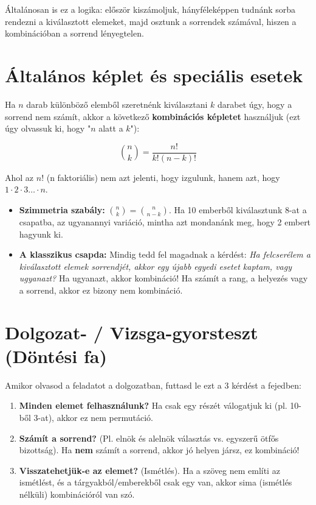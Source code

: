 \documentclass[11pt,a4paper]{article}
\begin{document}
Általánosan is ez a logika: először kiszámoljuk, hányféleképpen tudnánk sorba rendezni a kiválasztott elemeket, majd osztunk a sorrendek számával, hiszen a kombinációban a sorrend lényegtelen.

\section{Általános képlet és speciális esetek}
Ha $n$ darab különböző elemből szeretnénk kiválasztani $k$ darabet úgy, hogy a sorrend nem számít, akkor a következő \textbf{kombinációs képletet} használjuk (ezt úgy olvassuk ki, hogy "$n$ alatt a $k$"):

$$\binom{n}{k} = \frac{n!}{k!(n-k)!}$$

Ahol az $n!$ (n faktoriális) nem azt jelenti, hogy izgulunk, hanem azt, hogy $1 \cdot 2 \cdot 3 \dots \cdot n$.

\begin{tcolorbox}[title=Hasznos tulajdonságok és csapdák]
\begin{itemize}
    \item \textbf{Szimmetria szabály:} $\binom{n}{k} = \binom{n}{n-k}$. Ha 10 emberből kiválasztunk 8-at a csapatba, az ugyanannyi variáció, mintha azt mondanánk meg, hogy 2 embert hagyunk ki.
    \item \textbf{A klasszikus csapda:} Mindig tedd fel magadnak a kérdést: \textit{Ha felcserélem a kiválasztott elemek sorrendjét, akkor egy újabb egyedi esetet kaptam, vagy ugyanazt?} Ha ugyanazt, akkor kombináció! Ha számít a rang, a helyezés vagy a sorrend, akkor ez bizony nem kombináció.
\end{itemize}
\end{tcolorbox}

\section{Dolgozat- / Vizsga-gyorsteszt (Döntési fa)}
Amikor olvasod a feladatot a dolgozatban, futtasd le ezt a 3 kérdést a fejedben:
\begin{enumerate}
    \item \textbf{Minden elemet felhasználunk?} Ha csak egy részét válogatjuk ki (pl. 10-ből 3-at), akkor ez nem permutáció.
    \item \textbf{Számít a sorrend?} (Pl. elnök és alelnök választás vs. egyszerű ötfős bizottság). Ha \textbf{nem} számít a sorrend, akkor jó helyen jársz, ez kombináció!
    \item \textbf{Visszatehetjük-e az elemet?} (Ismétlés). Ha a szöveg nem említi az ismétlést, és a tárgyakból/emberekből csak egy van, akkor sima (ismétlés nélküli) kombinációról van szó.
\end{enumerate}
\end{document}
